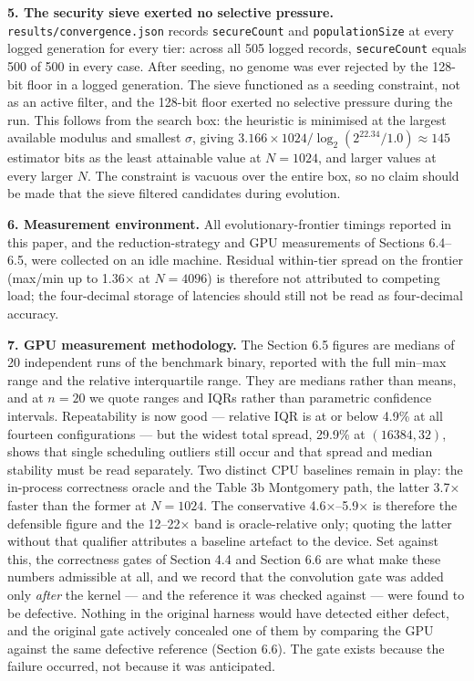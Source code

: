 \textbf{5. The security sieve exerted no selective pressure.} \texttt{results/convergence.json} records \texttt{secureCount} and \texttt{populationSize} at every logged generation for every tier: across all 505 logged records, \texttt{secureCount} equals 500 of 500 in every case. After seeding, no genome was ever rejected by the 128-bit floor in a logged generation. The sieve functioned as a seeding constraint, not as an active filter, and the 128-bit floor exerted no selective pressure during the run. This follows from the search box: the heuristic is minimised at the largest available modulus and smallest \(\sigma\), giving \(3.166 \times 1024 / \log_2(2^{22.34}/1.0) \approx 145\) estimator bits as the least attainable value at \(N = 1024\), and larger values at every larger \(N\). The constraint is vacuous over the entire box, so no claim should be made that the sieve filtered candidates during evolution.

\textbf{6. Measurement environment.} All evolutionary-frontier timings reported in this paper, and the reduction-strategy and GPU measurements of Sections 6.4--6.5, were collected on an idle machine. Residual within-tier spread on the frontier (max/min up to 1.36× at \(N = 4096\)) is therefore not attributed to competing load; the four-decimal storage of latencies should still not be read as four-decimal accuracy.

\textbf{7. GPU measurement methodology.} The Section 6.5 figures are medians of 20 independent runs of the benchmark binary, reported with the full min--max range and the relative interquartile range. They are medians rather than means, and at \(n = 20\) we quote ranges and IQRs rather than parametric confidence intervals. Repeatability is now good --- relative IQR is at or below 4.9\% at all fourteen configurations --- but the widest total spread, 29.9\% at \((16384, 32)\), shows that single scheduling outliers still occur and that spread and median stability must be read separately. Two distinct CPU baselines remain in play: the in-process correctness oracle and the Table 3b Montgomery path, the latter 3.7× faster than the former at \(N = 1024\). The conservative 4.6×--5.9× is therefore the defensible figure and the 12--22× band is oracle-relative only; quoting the latter without that qualifier attributes a baseline artefact to the device. Set against this, the correctness gates of Section 4.4 and Section 6.6 are what make these numbers admissible at all, and we record that the convolution gate was added only \emph{after} the kernel --- and the reference it was checked against --- were found to be defective. Nothing in the original harness would have detected either defect, and the original gate actively concealed one of them by comparing the GPU against the same defective reference (Section 6.6). The gate exists because the failure occurred, not because it was anticipated.

